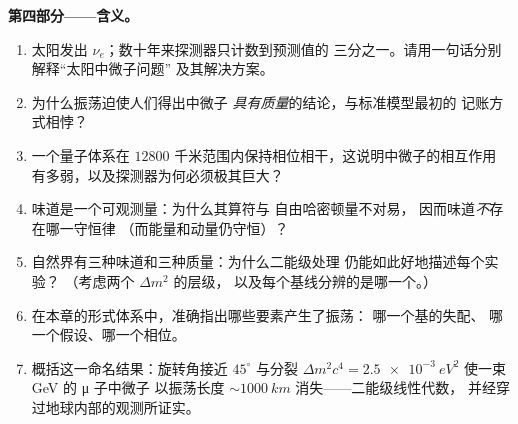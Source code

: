 \begin{problem}
\medskip\noindent\textbf{第四部分——含义。}
\begin{enumerate}[resume]
  \item 太阳发出 $\nu_e$；数十年来探测器只计数到预测值的
        三分之一。请用一句话分别解释“太阳中微子问题”
        及其解决方案。
  \item 为什么振荡迫使人们得出中微子
        \emph{具有质量}的结论，与标准模型最初的
        记账方式相悖？
  \item 一个量子体系在
        $12800$ 千米范围内保持相位相干，这说明中微子的相互作用
        有多弱，以及探测器为何必须极其巨大？
  \item 味道是一个可观测量：为什么其算符与
        自由哈密顿量不对易，
        因而味道\emph{不}存在哪一守恒律
        （而能量和动量仍守恒）？
  \item 自然界有三种味道和三种质量：为什么二能级处理
        仍能如此好地描述每个实验？
        （考虑两个 $\Delta m^2$ 的层级，
        以及每个基线分辨的是哪一个。）
  \item 在本章的形式体系中，准确指出哪些要素产生了振荡：
        哪一个基的失配、
        哪一个假设、哪一个相位。
  \item 概括这一命名结果：旋转角接近
        $45^\circ$ 与分裂 $\Delta m^2c^4 =
        \qty{2.5e-3}{eV^2}$ 使一束 GeV 的 μ 子中微子
        以振荡长度 $\sim\qty{1000}{km}$ 消失——二能级线性代数，
        并经穿过地球内部的观测所证实。
\end{enumerate}
\end{problem}
